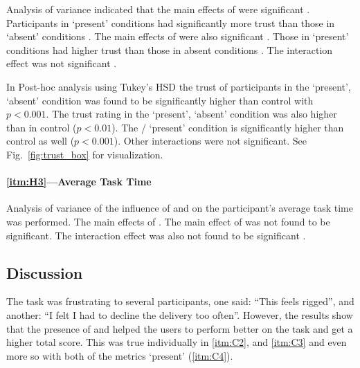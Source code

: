 Analysis of variance indicated that the main effects of \xQ{} were significant . Participants in \xQ{} `present' conditions  had significantly more trust than those in \xQ{} `absent' conditions . The main effects of \xO{} were also significant . Those in \xO{} `present' conditions  had higher trust than those in \xO{} absent conditions . The interaction effect was not significant .

In Post-hoc analysis using Tukey's HSD the trust of participants in the \xQ{} `present', \xO{} `absent' condition  was found to be significantly higher than control  with $p<0.001$. The trust rating in the \xO{} `present', \xQ{} `absent' condition  was also higher than in control ($p<0.01$). The \xQ/\xO{} `present' condition  is significantly higher than control as well ($p<0.001$). Other interactions were not significant. See Fig.~\ref{fig:trust_box} for visualization.

\paragraph{\ref{itm:H3}---Average Task Time}
Analysis of variance of the influence of \xQ{} and \xO{} on the participant's average task time was performed. The main effects of \xQ{} . The main effect of \xO{}  was not found to be significant. The interaction effect was also not found to be significant .

\subsection{Discussion} \label{sec:discussion}
The task was frustrating to several participants, one said: ``This feels rigged'', and another: ``I felt I had to decline the delivery too often''. However, the results show that the presence of \xQ{} and \xO{} helped the users to perform better on the task and get a higher total score. This was true individually in \ref{itm:C2}, and \ref{itm:C3} and even more so with both of the metrics `present' (\ref{itm:C4}). 

